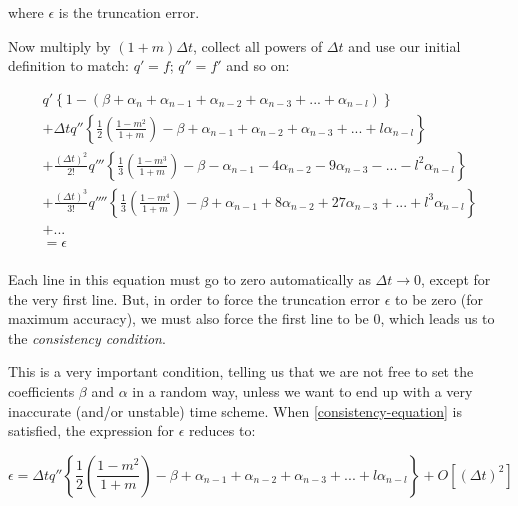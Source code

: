 where $\epsilon$ is the truncation error.

Now multiply by $(1+m) \Delta t$, collect all powers of $\Delta t$ and use our initial definition to match: $q'=f$; $q''=f'$ and so on:


\begin{multline}
q' \left\{1-(\beta +\alpha_n +\alpha_{n-1}+\alpha_{n-2}+\alpha_{n-3}+ ... +\alpha_{n-l})\right\}\\
+\Delta t q'' \left\{\frac{1}{2}\left(\frac{1-m^2}{1+m}\right)-\beta  +\alpha_{n-1}+\alpha_{n-2}+\alpha_{n-3}+ ... +l\alpha_{n-l}\right\} \\
+\frac{(\Delta t)^2}{2!} q''' \left\{\frac{1}{3}\left(\frac{1-m^3}{1+m}\right)-\beta  -\alpha_{n-1}-4\alpha_{n-2}-9\alpha_{n-3}- ... -l^2\alpha_{n-l}\right\}  \\
+\frac{(\Delta t)^3}{3!} q'''' \left\{\frac{1}{3}\left(\frac{1-m^4}{1+m}\right)-\beta  +\alpha_{n-1}+8\alpha_{n-2}+27\alpha_{n-3}+ ... +l^3\alpha_{n-l}\right\}  \\
+ ... \\
=  \epsilon \\
\label{discretisation-error}
\end{multline}

Each line in this equation must go to zero automatically as $\Delta t \rightarrow 0$, except for the very first line. But, in order to force the truncation error $\epsilon$ to be zero (for maximum accuracy), we must also force the first line to be $0$, which leads us to the \emph{consistency condition}.

\vspace{1em}

This is a very important condition, telling us that we are not free to set the coefficients $\beta$ and $\alpha$ in a random way, unless we want to end up with a very inaccurate (and/or unstable) time scheme. When \ref{consistency-equation} is satisfied, the expression for $\epsilon$ reduces to:

\begin{equation}
	\epsilon = \Delta t q'' \left\{\frac{1}{2}\left(\frac{1-m^2}{1+m}\right)-\beta  +\alpha_{n-1}+\alpha_{n-2}+\alpha_{n-3}+ ... +l\alpha_{n-l}\right\} +O\left[(\Delta t)^2\right]
	\label{consistency-truncation}
\end{equation}

